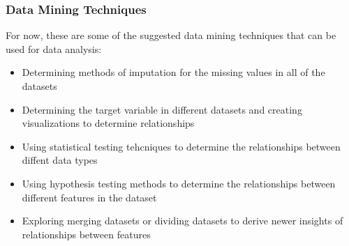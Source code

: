 \documentclass[a4paper]{article}
\begin{document}
\subsubsection{Data Mining Techniques}
For now, these are some of the suggested data mining techniques that can be used for data analysis:
\begin{itemize}
    \item Determining methods of imputation for the missing values in all of the datasets
    \item Determining the target variable in different datasets and creating visualizations to determine relationships
    \item Using statistical testing tehcniques to determine the relationships between diffent data types
    \item Using hypothesis testing methods to determine the relationships between different features in the dataset
    \item Exploring merging datasets or dividing datasets to derive newer insights of relationships between features
\end{itemize}
\end{document}
